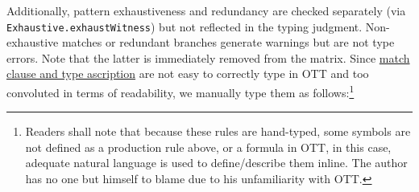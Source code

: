 \documentclass[a4paper, 11pt]{article}
\theoremstyle{remark}\newtheorem*{remark}{Remark}
\theoremstyle{definition}\newtheorem*{definition}{Definition}
\begin{document}
Additionally, pattern exhaustiveness and redundancy are checked separately
(via \texttt{Exhaustive.exhaustWitness})
but not reflected in the typing judgment. Non-exhaustive matches or redundant branches generate
warnings but are not type errors. Note that the latter is immediately removed from the matrix.
Since \underline{match clause and type ascription} are not easy to correctly type in OTT and too convoluted in terms of readability, we manually type them as follows:\footnote{
Readers shall note that because these rules are hand-typed, some symbols are not defined
as a production rule above, or a formula in OTT, in this case, adequate natural language
is used to define/describe them inline.
The author has no one but himself to blame due to his unfamiliarity
with OTT.
}
\end{document}
